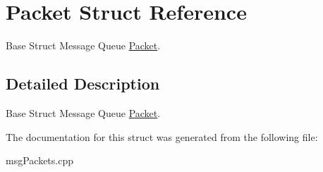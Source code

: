 \hypertarget{structPacket}{\section{Packet Struct Reference}
\label{structPacket}
}


Base Struct Message Queue \hyperlink{structPacket}{Packet}.  




\subsection{Detailed Description}
Base Struct Message Queue \hyperlink{structPacket}{Packet}. 

The documentation for this struct was generated from the following file\-:\begin{DoxyCompactItemize}
\item 
msg\-Packets.\-cpp\end{DoxyCompactItemize}
